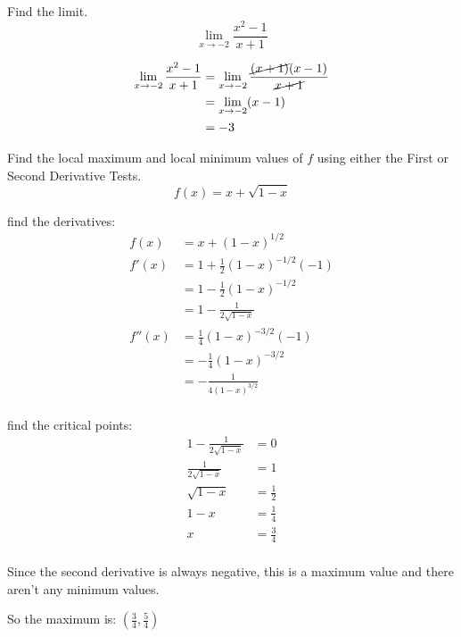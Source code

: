 \documentclass[fleqn,addpoints]{exam}
\begin{document}
\begin{questions}
\ifprintanswers
\pagebreak
\fi

\question
Find the limit. 
\[
  \lim_{x \to -2} \frac{x^2 - 1}{x + 1}
\]

\begin{solution}
\begin{align*}
  \lim_{x \to -2} \frac{x^2 - 1}{x + 1} &= \lim_{x \to -2} \frac{\cancel{(x + 1)}(x - 1)}{\cancel{x + 1}} \\
  &= \lim_{x \to -2} (x - 1) \\
  &= -3 \\
\end{align*}
\end{solution}

\ifprintanswers
\pagebreak
\fi

\question
Find the local maximum and local minimum values of $f$ using either the First or Second Derivative Tests.
\[
  f(x) = x + \sqrt{1 - x}
\]

\begin{solution}

find the derivatives:
\begin{align*}
  f(x) &= x + (1 - x)^{1/2} \\
  f'(x) &= 1 + \frac{1}{2}(1 - x)^{-1/2}(-1) \\
        &= 1 - \frac{1}{2}(1 - x)^{-1/2} \\
        &= 1 - \frac{1}{2 \sqrt{1 - x}} \\
  f''(x) &= \frac{1}{4}(1 - x)^{-3/2}(-1) \\
         &= -\frac{1}{4}(1 - x)^{-3/2} \\
         &= -\frac{1}{4(1 - x)^{3/2}} \\
\end{align*}

find the critical points:
\begin{align*}
  1 - \frac{1}{2 \sqrt{1 - x}} &= 0 \\
  \frac{1}{2 \sqrt{1 - x}} &= 1 \\
  \sqrt{1 - x} &= \frac{1}{2} \\
  1 - x &= \frac{1}{4} \\
  x &= \frac{3}{4} \\
\end{align*}

Since the second derivative is always negative, this is a maximum value and there aren't any minimum values.

So the maximum is: $\left(\frac{3}{4}, \frac{5}{4} \right)$


\end{solution}
\end{questions}
\end{document}
